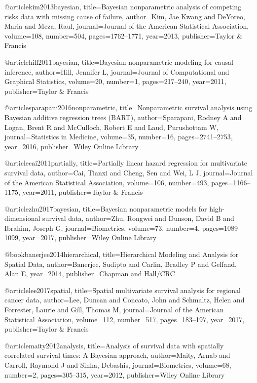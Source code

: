 @article{kim2013bayesian,
  title={Bayesian nonparametric analysis of competing risks data with missing cause of failure},
  author={Kim, Jae Kwang and DeYoreo, Maria and Meza, Raul},
  journal={Journal of the American Statistical Association},
  volume={108},
  number={504},
  pages={1762--1771},
  year={2013},
  publisher={Taylor \& Francis}
}

@article{hill2011bayesian,
  title={Bayesian nonparametric modeling for causal inference},
  author={Hill, Jennifer L},
  journal={Journal of Computational and Graphical Statistics},
  volume={20},
  number={1},
  pages={217--240},
  year={2011},
  publisher={Taylor \& Francis}
}


@article{sparapani2016nonparametric,
  title={Nonparametric survival analysis using Bayesian additive regression trees (BART)},
  author={Sparapani, Rodney A and Logan, Brent R and McCulloch, Robert E and Laud, Purushottam W},
  journal={Statistics in Medicine},
  volume={35},
  number={16},
  pages={2741--2753},
  year={2016},
  publisher={Wiley Online Library}
}



@article{cai2011partially,
  title={Partially linear hazard regression for multivariate survival data},
  author={Cai, Tianxi and Cheng, Sen and Wei, L J},
  journal={Journal of the American Statistical Association},
  volume={106},
  number={493},
  pages={1166--1175},
  year={2011},
  publisher={Taylor \& Francis}
}

@article{zhu2017bayesian,
  title={Bayesian nonparametric models for high-dimensional survival data},
  author={Zhu, Rongwei and Dunson, David B and Ibrahim, Joseph G},
  journal={Biometrics},
  volume={73},
  number={4},
  pages={1089--1099},
  year={2017},
  publisher={Wiley Online Library}
}

@book{banerjee2014hierarchical,
  title={Hierarchical Modeling and Analysis for Spatial Data},
  author={Banerjee, Sudipto and Carlin, Bradley P and Gelfand, Alan E},
  year={2014},
  publisher={Chapman and Hall/CRC}
}


@article{lee2017spatial,
  title={Spatial multivariate survival analysis for regional cancer data},
  author={Lee, Duncan and Concato, John and Schmaltz, Helen and Forrester, Laurie and Gill, Thomas M},
  journal={Journal of the American Statistical Association},
  volume={112},
  number={517},
  pages={183--197},
  year={2017},
  publisher={Taylor \& Francis}
}

@article{maity2012analysis,
  title={Analysis of survival data with spatially correlated survival times: A Bayesian approach},
  author={Maity, Arnab and Carroll, Raymond J and Sinha, Debashis},
  journal={Biometrics},
  volume={68},
  number={2},
  pages={305--315},
  year={2012},
  publisher={Wiley Online Library}
}

